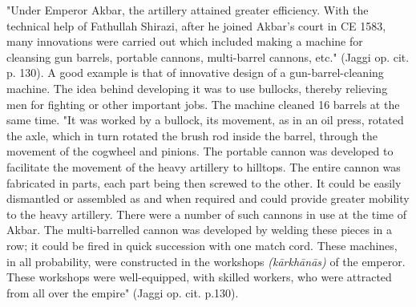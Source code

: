 "Under Emperor Akbar, the artillery attained greater efficiency. With the technical help of Fathullah Shirazi, after he joined Akbar's court in CE 1583, many innovations were carried out which included making a machine for cleansing gun barrels, portable cannons, multi-barrel cannons, etc." (Jaggi op. cit. p. 130). A good example is that of innovative design of a gun-barrel-cleaning machine. The idea behind developing it was to use bullocks, thereby relieving men for fighting or other important jobs. The machine cleaned 16 barrels at the same time. "It was worked by a bullock, its movement, as in an oil press, rotated the axle, which in turn rotated the brush rod inside the barrel, through the movement of the cogwheel and pinions. The portable cannon was developed to facilitate the movement of the heavy artillery to hilltops. The entire cannon was fabricated in parts, each part being then screwed to the other. It could be easily dismantled or assembled as and when required and could provide greater mobility to the heavy artillery. There were a number of such cannons in use at the time of Akbar. The multi-barrelled cannon was developed by welding these pieces in a row; it could be fired in quick succession with one match cord. These machines, in all probability, were constructed in the workshops \textit{(kārkhānās) }of the emperor. These workshops were well-equipped, with skilled workers, who were attracted from all over the empire" (Jaggi op. cit. p.130).

